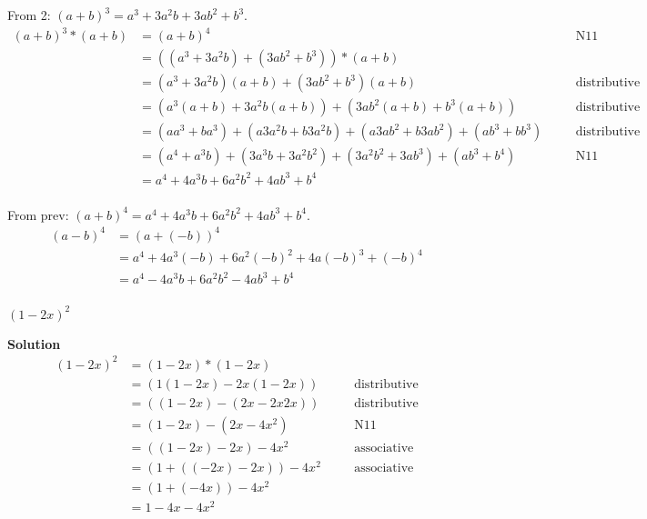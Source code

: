 \documentclass[6pt]{article}
\begin{document}
From 2: ${(a + b)}^3 = a^3 + 3 a^2 b + 3ab^2 + b^3$.
\begin{align*}
{(a + b)}^3 * (a + b) &= {(a + b)}^4 && \quad \text{N11} \\
&= ((a^3 + 3 a^2 b) + (3ab^2 + b^3)) * (a + b) && \quad \text{} \\
&= (a^3 + 3 a^2 b)(a + b) + (3ab^2 + b^3)(a + b) && \quad \text{distributive} \\
&= (a^3(a + b) + 3 a^2 b(a + b)) + (3ab^2(a + b) + b^3(a + b)) && \quad \text{distributive} \\
&= (a a^3 + b a^3) + (a 3 a^2 b + b 3 a^2 b) + (a 3ab^2 + b 3ab^2) + (a b^3 + b b^3) && \quad \text{distributive} \\
&= (a^4 + a^3 b) + (3 a^3 b + 3 a^2 b^2) + (3 a^2 b^2 + 3 a b^3) + (a b^3 + b^4) && \quad \text{N11} \\
&= a^4 + 4 a^3 b + 6 a^2 b^2 + 4 a b^3 + b^4 && \quad \text{} \\
\end{align*}

From prev: ${(a + b)}^4 = a^4 + 4 a^3 b + 6 a^2 b^2 + 4 a b^3 + b^4$.
\begin{align*}
{(a-b)}^4 &= {(a + (-b))}^4 \\
&= a^4 + 4 a^3 (-b) + 6 a^2 {(-b)}^2 + 4 a {(-b)}^3 + {(-b)}^4 \\
&= a^4 - 4 a^3 b + 6 a^2 b^2 - 4 a b^3 + b^4 \\
\end{align*}

\begin{tcolorbox}[title=Problem 5, breakable]
${(1 - 2 x)}^2$
\end{tcolorbox}

\textbf{Solution}
\begin{align*}
{(1 - 2 x)}^2 &= (1 - 2 x) * (1 - 2 x) && \\
&= (1(1 - 2 x) - 2 x(1 - 2 x)) && \quad \text{distributive} \\
&= ((1 - 2 x) - (2x - 2 x 2 x)) && \quad \text{distributive} \\
&= (1 - 2 x) - (2x - 4 x^2) && \quad \text{N11} \\
&= ((1 - 2 x) - 2x) - 4 x^2 && \quad \text{associative} \\
&= (1 + ((- 2 x) - 2x)) - 4 x^2 && \quad \text{associative} \\
&= (1 + (-4x)) - 4 x^2 && \quad \text{} \\
&= 1 - 4x - 4 x^2 && \quad \text{} \\
\end{align*}
\end{document}
